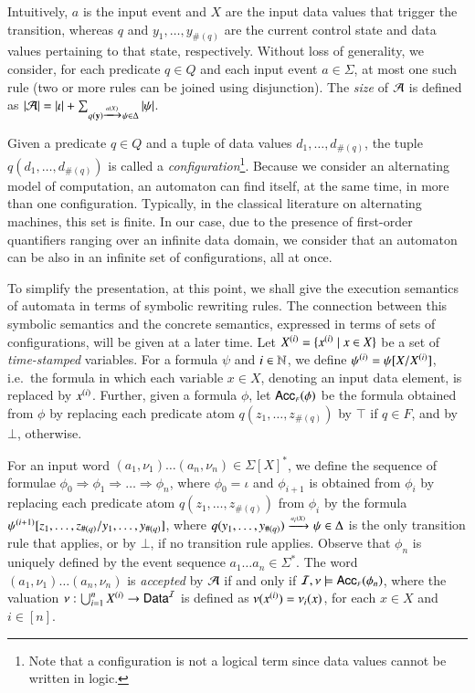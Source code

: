 \documentclass{llncs}
\begin{document}
Intuitively, $a$ is the input event and $X$ are the input data values
that trigger the transition, whereas $q$ and $y_1,\ldots,y_{\#(q)}$
are the current control state and data values pertaining to that
state, respectively. Without loss of generality, we consider, for each
predicate $q \in Q$ and each input event $a \in \Sigma$, at most one
such rule (two or more rules can be joined using disjunction). The
\emph{size} of $\mathcal{A}$ is defined as ${|{\mathcal{A}}|} = {|{\iota}|} +
\sum_{q(\mathbf y) \xrightarrow{{\scriptscriptstyle a(X)}}_{{\scriptstyle }} \psi \in \Delta} {|{\psi}|}$.

Given a predicate $q \in Q$ and a tuple of data values
$d_1,\ldots,d_{\#(q)}$, the tuple $q(d_1,\ldots,d_{\#(q)})$ is called
a \emph{configuration}\footnote{Note that a configuration is not a
  logical term since data values cannot be written in logic.}.
Because we consider an alternating model of computation, an automaton
can find itself, at the same time, in more than one
configuration. Typically, in the classical literature on alternating
machines, this set is finite. In our case, due to the presence of
first-order quantifiers ranging over an infinite data domain, we
consider that an automaton can be also in an infinite set of
configurations, all at once.

To simplify the presentation, at this point, we shall give the
execution semantics of automata in terms of symbolic rewriting rules.
The connection between this symbolic semantics and the concrete
semantics, expressed in terms of sets of configurations, will be given
at a later time. Let ${X}^{({i})} = \{ {x}^{({i})} \mid x \in X \}$
be a set of \emph{time-stamped} variables. For a formula $\psi$ and $i
\in {\bf \mathbb{N}}$, we define ${\psi}^{({i})} = \psi[X/{X}^{({i})}]$,
i.e.\ the formula in which each variable $x \in X$, denoting an input
data element, is replaced by ${x}^{({i})}$. Further, given a formula
$\phi$, let $\mathsf{Acc}_{\scriptscriptstyle{F}}({\phi})$ be the formula obtained from $\phi$ by
replacing each predicate atom $q(z_1,\ldots,z_{\#(q)})$ by $\top$ if
$q \in F$, and by $\bot$, otherwise.

For an input word $(a_1,\nu_1) \ldots (a_n,\nu_n) \in \Sigma[X]^*$,
we define the sequence of formulae \(\phi_0 \Rightarrow \phi_1
\Rightarrow \ldots \Rightarrow \phi_n\), where $\phi_0 = \iota$ and
$\phi_{i+1}$ is obtained from $\phi_i$ by replacing each predicate
atom $q(z_1,\ldots,z_{\#(q)})$ from $\phi_i$ by the formula
${\psi}^{({i+1})}[z_1, \ldots, z_{\#(q)}/y_1,\ldots,y_{\#(q)}]$,
where $q(y_1,\ldots,y_{\#(q)}) \xrightarrow{{\scriptscriptstyle a_i(X)}}_{{\scriptstyle }} \psi \in \Delta$ is
the only transition rule that applies, or by $\bot$, if no transition
rule applies. Observe that $\phi_n$ is uniquely defined by the event
sequence $a_1 \ldots a_n \in \Sigma^*$. The word $(a_1,\nu_1) \ldots
(a_n,\nu_n)$ is \emph{accepted} by $\mathcal{A}$ if and only if $\mathcal{I},\nu \models
\mathsf{Acc}_{\scriptscriptstyle{F}}({\phi_n})$, where the valuation $\nu : \bigcup_{i=1}^n
{X}^{({i})} \rightarrow \mathsf{Data}^{\mathcal{I}}$ is defined as $\nu({x}^{({i})}) =
\nu_i(x)$, for each $x \in X$ and $i \in [n]$.
\end{document}

